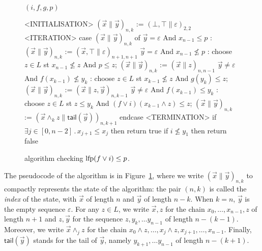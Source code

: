 \begin{figure}[t]
	\begin{center}
		\underline{{\APDR} $(i,f,g,p)$}
		{\small
			\begin{codeNT}
<INITIALISATION>
  $( \vec{x} \| \vec{y} )_{n,k}$ := $(\bot,\top\|\varepsilon)_{2,2}$
<ITERATION>						           %
  case $( \vec{x} \| \vec{y} )_{n,k}$ of
	   $\vec{y}=\varepsilon$ And $x_{n-1} \le p$     :                    %
			$( \vec{x} \| \vec{y} )_{n,k}$ := $( \vec{x}, \top \| \varepsilon )_{n+1,n+1}$
	   $\vec{y}=\varepsilon$ And $x_{n-1} \not\le p$    :                     %
			choose $z\in L$ st  $x_{n-1} \not\le z$ And  $p \le z$;
			$( \vec{x} \| \vec{y} )_{n,k}$ := $( \vec{x} \| z )_{n,n-1}$
	   $\vec{y} \neq \varepsilon$ And $f(x_{k-1}) \not \le y_k$ :                        %
			choose $z \in L$ st $x_{k-1} \not \le z$ And $g(y_k) \le z$;
			$(\vec{x} \| \vec{y} )_{n,k}$ := $(\vec{x} \| z , \vec{y} )_{n,k-1}$
	   $\vec{y} \neq \varepsilon$ And $f(x_{k-1}) \le y_k$ :                        %
			choose $z \in L$ st $z \le y_k$ And $(f \lor i)(x_{k-1} \land z) \le z$;
			$(\vec{x} \| \vec{y} )_{n,k}$ := $(\vec{x} \land_k z \| \mathsf{tail}(\vec{y}) )_{n,k+1}$
  endcase
<TERMINATION>
	if $\exists j\in [0,n-2]\,.\, x_{j+1} \le x_j$ then return true		 %
	if $i \not \le y_1$ then return false							%
\end{codeNT}
		}
	\end{center}
	\caption{{\APDR} algorithm checking $\text{lfp}(f \lor i) \le p$.}\label{fig:pdr:apdr}
\end{figure}

The pseudocode of the algorithm is in Figure~\ref{fig:pdr:apdr}, where we write $( \vec{x} \| \vec{y} )_{n,k}$ to compactly represents the state of the algorithm: the pair $(n,k)$ is called the \emph{index} of the state, with $\vec{x}$ of length $n$ and $\vec{y}$ of length $n-k$. When $k = n$, $\vec{y}$ is the empty sequence $\varepsilon$. For any $z \in L$, we write $\vec{x}, z$ for the chain $x_0, \dots, x_{n-1}, z$ of length $n+1$ and $z, \vec{y}$ for the sequence $z, y_k, \dots y_{n-1}$ of length $n-(k-1)$. Moreover, we write $\vec{x} \land_j z$ for the chain $x_0 \land z, \dots, x_j \land z, x_{j+1}, \dots , x_{n-1}$. Finally, $\mathsf{tail}(\vec{y})$ stands for the tail of $\vec{y}$, namely $y_{k+1}, \dots y_{n-1}$ of length $n-(k+1)$.

